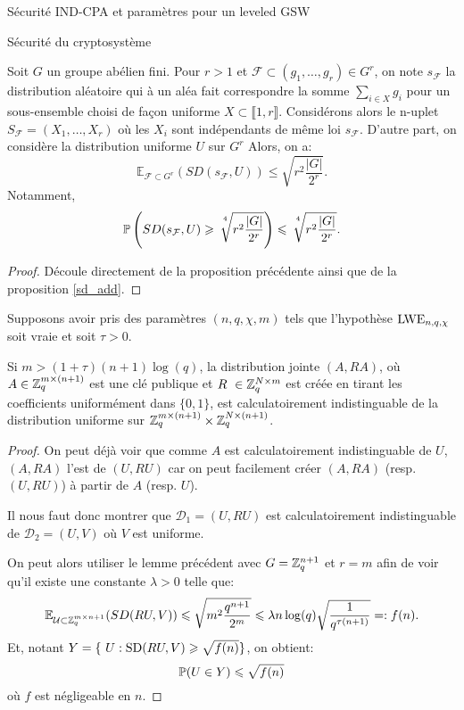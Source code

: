 \begin{section}{Sécurité IND-CPA et paramètres pour un leveled GSW}
\begin{subsection}{Sécurité du cryptosystème}
	\begin{cor}
	Soit $G$ un groupe abélien fini. Pour $r > 1$ et 
	$\mathcal{F} \subset (g_1, \ldots, g_r) \in G^r$, on
	note
	 $s_\mathcal{F}$ la distribution aléatoire qui à un aléa
	 fait correspondre la somme $\sum_{i\in X} g_i$ pour un
	 sous-ensemble choisi de façon uniforme  $X\subset \llbracket
	 1, r \rrbracket$. 
	 Considérons alors le n-uplet $S_\mathcal{F} = (X_1, \ldots, X_r)$ où 
	 les $X_i$ sont indépendants de même loi
	 $s_\mathcal{F}$.
	 D'autre part, on considère la distribution uniforme
	 $U$ sur $G^r$
	 Alors, on a: 
	 \[\mathbb{E}_{\mathcal{F}\subset G^r}(SD(s_\mathcal{F},U)) \leqslant
	   \sqrt{r^2\frac{|G|}{2^r}}.\]
	 Notamment, 
	 \[\mathbb{P}\left(SD(s_\mathcal{F},U) \geqslant
		 \sqrt[\leftroot{-3}\uproot{8}4\:]{r^2\frac{|G|}{2^r}} \right) \leqslant
		 \sqrt[\leftroot{-3}\uproot{8}4\:]{r^2\frac{|G|}{2^r}}.
	 \]
	\end{cor}
	\begin{proof}
		Découle directement de la proposition précédente ainsi que de
		la proposition \ref{sd_add}.
	\end{proof}

	\begin{prop}
	Supposons avoir pris des paramètres $(n, q, \chi, m)$ tels que l'hypothèse $\text{LWE}_{n,q,\chi}$ soit vraie et soit $\tau > 0$.

	Si $m > (1+\tau)(n+1)\log(q)$, la distribution jointe $(A, RA)$, où 
	$A\in\mathbb{Z}_q^{m \times (n+1)}$ est une clé publique et $R \in\ZZq^{N \times m}$ est créée en tirant les coefficients
	uniformément dans $\{0,1\}$, est calculatoirement indistinguable de la
	distribution uniforme sur $\mathbb{Z}_q^{m \times (n+1)} \times \mathbb{Z}_q^{N
	\times (n+1)}$.
	\end{prop}
	
	\begin{proof}
	On peut déjà voir que comme $A$ est calculatoirement
	indistinguable de $U$, $(A, RA)$ l'est de $(U,RU)$ car on 
	peut facilement créer $(A, RA)$ (resp. $(U, RU)$) à partir de
	$A$ (resp. $U$).

	Il nous faut donc montrer que $\mathcal{D}_1 = (U, RU)$ est calculatoirement
	indistinguable de $\mathcal{D}_2 = (U, V)$ où $V$ est uniforme.
	
	On peut alors utiliser le lemme précédent avec $G = \mathbb{Z}_q^{n+1}$
	et $r = m$ afin de voir qu'il existe une constante $\lambda > 0$
	telle que:
	\[\mathbb{E}_{\mathcal{U}\subset \mathbb{Z}_q^{m\times n+1}}(SD(RU,V)) \leqslant
		\sqrt{m^2\frac{q^{n+1}}{2^m}}\leqslant \lambda
	n\log(q)\sqrt{\frac{1}{q^{\tau(n+1)}}}=: f(n). \]
	Et, notant $Y = \{ U: \SD(RU,V) \geqslant \sqrt{f(n)}\}$, on obtient:
	\[\mathbb{P}(U \in Y) \leqslant \sqrt{f(n)} \]
	où $f$ est négligeable en $n$. 


\end{proof}
\end{subsection}
\end{section}
